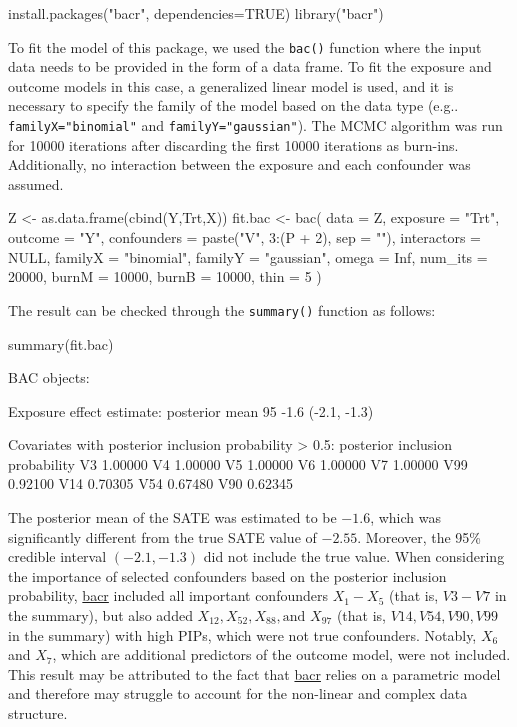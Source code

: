 \begin{example}
install.packages("bacr", dependencies=TRUE)
library("bacr")
\end{example}
To fit the model of this package, we used the \verb|bac()| function where the input data needs to be provided in the form of a data frame. To fit the exposure and outcome models in this case, a generalized linear model is used, and it is necessary to specify the family of the model based on the data type (e.g.. \verb|familyX="binomial"| and \verb|familyY="gaussian"|). The MCMC algorithm was run for 10000 iterations after discarding the first 10000 iterations as burn-ins. Additionally, no interaction between the exposure and each confounder was assumed.
\begin{example}
Z <- as.data.frame(cbind(Y,Trt,X))
fit.bac <- bac(
     data = Z, exposure = "Trt", outcome = "Y", 
     confounders = paste("V", 3:(P + 2), sep = ""),
     interactors = NULL, familyX = "binomial", familyY = "gaussian", 
     omega = Inf, num_its = 20000, burnM = 10000, burnB = 10000, thin = 5
   )
\end{example}
The result can be checked through the \verb|summary()| function as follows:
\begin{example}
summary(fit.bac)

BAC objects:

Exposure effect estimate:
        posterior mean     95%
                  -1.6               (-2.1, -1.3)     


Covariates with posterior inclusion probability > 0.5:
    posterior inclusion probability
V3                          1.00000
V4                          1.00000
V5                          1.00000
V6                          1.00000
V7                          1.00000
V99                         0.92100
V14                         0.70305
V54                         0.67480
V90                         0.62345
\end{example}
The posterior mean of the SATE was estimated to be $-1.6$, which was significantly different from the true SATE value of $-2.55$. Moreover, the 95\% credible interval $(-2.1, -1.3)$ did not include the true value. When considering the importance of selected confounders based on the posterior inclusion probability, \href{https://CRAN.R-project.org/package=bacr}{bacr} included all important confounders $X_1-X_5$ (that is, $V3-V7$ in the summary), but also added $X_{12}, X_{52}, X_{88}, \text {and } X_{97}$ (that is, $V14, V54, V90, V99$ in the summary) with high PIPs, which were not true confounders. Notably, $X_6$ and $X_7$, which are additional predictors of the outcome model, were not included. This result may be attributed to the fact that \href{https://CRAN.R-project.org/package=bacr}{bacr} relies on a parametric model and therefore may struggle to account for the non-linear and complex data structure.



